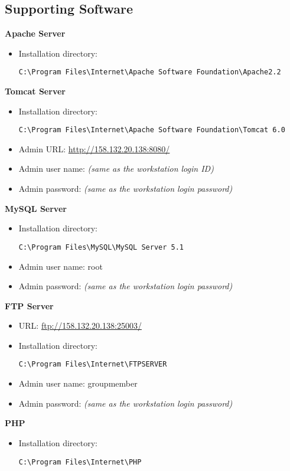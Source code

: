 \subsection{Supporting Software}
\textbf{Apache Server}
\begin{itemize}
\item Installation directory: \begin{verbatim}C:\Program Files\Internet\Apache Software Foundation\Apache2.2\end{verbatim}
\end{itemize}
\textbf{Tomcat Server}
\begin{itemize}
\item Installation directory: \begin{verbatim}C:\Program Files\Internet\Apache Software Foundation\Tomcat 6.0\end{verbatim}
\item Admin URL: \url{http://158.132.20.138:8080/}
\item Admin user name: \emph{(same as the workstation login ID)}
\item Admin password: \emph{(same as the workstation login password)}
\end{itemize}
\textbf{MySQL Server}
\begin{itemize}
\item Installation directory: \begin{verbatim}C:\Program Files\MySQL\MySQL Server 5.1\end{verbatim}
\item Admin user name: root
\item Admin password: \emph{(same as the workstation login password)}
\end{itemize}
\textbf{FTP Server}
\begin{itemize}
\item URL: \url{ftp://158.132.20.138:25003/}
\item Installation directory: \begin{verbatim}C:\Program Files\Internet\FTPSERVER\end{verbatim}
\item Admin user name: groupmember
\item Admin password: \emph{(same as the workstation login password)}
\end{itemize}
\textbf{PHP}
\begin{itemize}
\item Installation directory: \begin{verbatim}C:\Program Files\Internet\PHP\end{verbatim}
\end{itemize}
